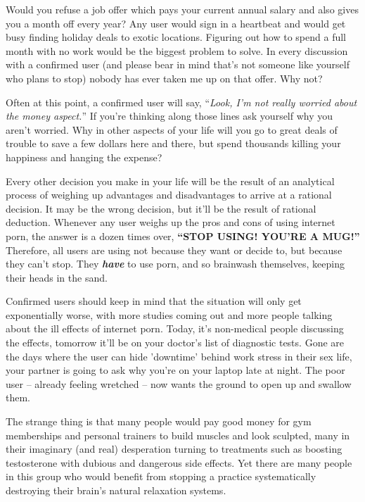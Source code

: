 \documentclass[
]{book}
\begin{document}
Would you refuse a job offer which pays your current annual salary and also gives you a month off every year? Any user would sign in a heartbeat and would get busy finding holiday deals to exotic locations. Figuring out how to spend a full month with no work would be the biggest problem to solve. In every discussion with a confirmed user (and please bear in mind that's not someone like yourself who plans to stop) nobody has ever taken me up on that offer. Why not?

Often at this point, a confirmed user will say, ``\emph{Look, I'm not really worried about the money aspect.}'' If you're thinking along those lines ask yourself why you aren't worried. Why in other aspects of your life will you go to great deals of trouble to save a few dollars here and there, but spend thousands killing your happiness and hanging the expense?

Every other decision you make in your life will be the result of an analytical process of weighing up advantages and disadvantages to arrive at a rational decision. It may be the wrong decision, but it'll be the result of rational deduction. Whenever any user weighs up the pros and cons of using internet porn, the answer is a dozen times over, \textbf{``STOP USING! YOU'RE A MUG!''} Therefore, all users are using not because they want or decide to, but because they can't stop. They \textbf{\emph{have}} to use porn, and so brainwash themselves, keeping their heads in the sand.

Confirmed users should keep in mind that the situation will only get exponentially worse, with more studies coming out and more people talking about the ill effects of internet porn. Today, it's non-medical people discussing the effects, tomorrow it'll be on your doctor's list of diagnostic tests. Gone are the days where the user can hide 'downtime' behind work stress in their sex life, your partner is going to ask why you're on your laptop late at night. The poor user -- already feeling wretched -- now wants the ground to open up and swallow them.

The strange thing is that many people would pay good money for gym memberships and personal trainers to build muscles and look sculpted, many in their imaginary (and real) desperation turning to treatments such as boosting testosterone with dubious and dangerous side effects. Yet there are many people in this group who would benefit from stopping a practice systematically destroying their brain's natural relaxation systems.
\end{document}
